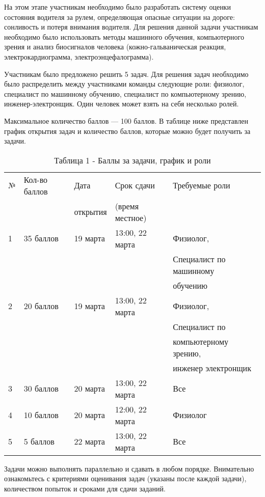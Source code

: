 На этом этапе участникам необходимо было разработать систему оценки состояния водителя за рулем, определяющая опасные ситуации на дороге: сонливость и потеря внимания водителя. Для решения данной задачи участникам необходимо было использовать методы машинного обучения, компьютерного зрения и анализ биосигналов человека (кожно-гальваническая реакция, электрокардиограмма, электроэнцефалограмма).

Участникам было предложено решить 5 задач. Для решения задач необходимо было распределить между участниками команды следующие роли: физиолог, специалист по машинному обучению, специалист по компьютерному зрению, инженер-электронщик. Один человек может взять на себя несколько ролей. 

Максимальное количество баллов — 100 баллов. В таблице ниже представлен график открытия задач и количество баллов, которые можно будет получить за задачи.

\begin{table}[H]
    \caption{Таблица 1 - Баллы за задачи, график и роли}
    \begin{tabular}{|l|l|l|l|l|}
    \hline
    № &	Кол-во баллов & Дата & Срок сдачи & Требуемые роли \\
                    & & открытия & (время местное) &  \\            
    \hline
    1 & 35 баллов & 19 марта & 13:00, 22 марта & Физиолог, \\
                                             & & & & Специалист по машинному \\
                                             & & & & обучению \\
    2 & 20 баллов & 19 марта & 13:00, 22 марта & Физиолог, \\
                                              & & & & Специалист по \\ 
                                              & & & & компьютерному зрению, \\
                                              & & & & инженер электронщик \\
    3 & 30 баллов & 20 марта & 13:00, 22 марта & Все \\
    4 & 10 баллов & 20 марта & 12:00, 22 марта & Физиолог \\
    5 & 5 баллов & 22 марта & 13:00, 22 марта & Все \\
    \hline
    \end{tabular}
\end{table}

Задачи можно выполнять параллельно и сдавать в любом порядке. Внимательно ознакомьтесь с критериями оценивания задач (указаны после каждой задачи), количеством попыток и сроками для сдачи заданий.